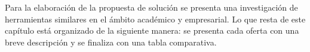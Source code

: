 Para la elaboración de la propuesta de solución se presenta una investigación de herramientas similares en el ámbito académico y empresarial. Lo que resta de este capítulo está organizado de la siguiente manera: se presenta cada oferta con una breve descripción y se finaliza con una tabla comparativa.







%

